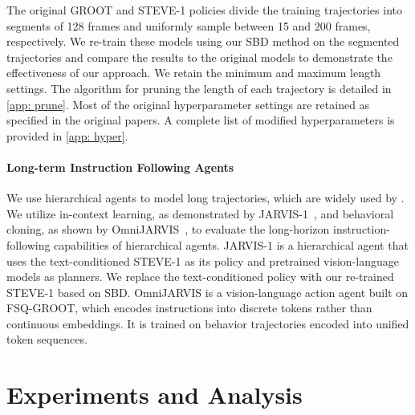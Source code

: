 The original GROOT and STEVE-1 policies divide the training trajectories into segments of 128 frames and uniformly sample between 15 and 200 frames, respectively. We re-train these models using our SBD method on the segmented trajectories and compare the results to the original models to demonstrate the effectiveness of our approach.
We retain the minimum and maximum length settings. The algorithm for pruning the length of each trajectory is detailed in \ref{app: prune}. Most of the original hyperparameter settings are retained as specified in the original papers. A complete list of modified hyperparameters is provided in \cref{app: hyper}.

\paragraph{Long-term Instruction Following Agents}
We use hierarchical agents to model long trajectories, which are widely used by \citep{palm-e,omnijarvis,deps}.
We utilize in-context learning, as demonstrated by JARVIS-1~\citep{jarvis-1}, and behavioral cloning, as shown by OmniJARVIS~\citep{omnijarvis}, to evaluate the long-horizon instruction-following capabilities of hierarchical agents.
JARVIS-1 is a hierarchical agent that uses the text-conditioned STEVE-1 as its policy and pretrained vision-language models as planners. We replace the text-conditioned policy with our re-trained STEVE-1 based on SBD. OmniJARVIS is a vision-language action agent built on FSQ-GROOT, which encodes instructions into discrete tokens rather than continuous embeddings. It is trained on behavior trajectories encoded into unified token sequences.

\section{Experiments and Analysis}
\label{sec:results}

